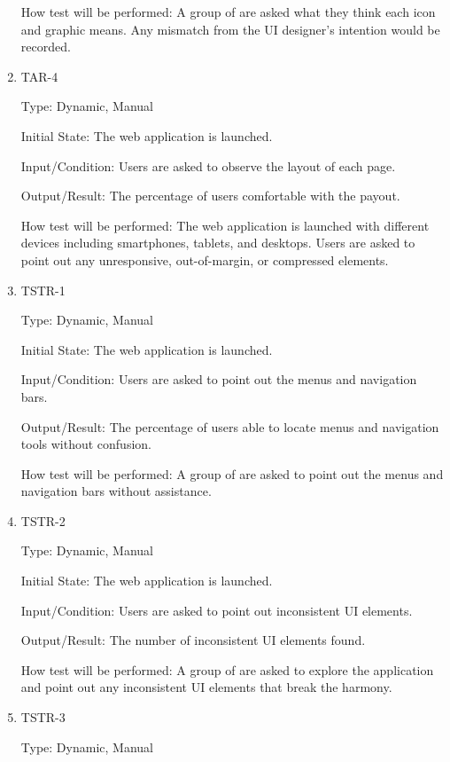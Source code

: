 \documentclass[12pt, titlepage]{article}
\begin{document}
\begin{enumerate}
How test will be performed: A group of are asked what they think each icon and graphic means. Any mismatch from the UI designer's intention would be recorded.

\item{TAR-4\\}

Type: Dynamic, Manual
					
Initial State: The web application is launched.
					
Input/Condition: Users are asked to observe the layout of each page.
					
Output/Result: The percentage of users comfortable with the payout.
					
How test will be performed: The web application is launched with different devices including smartphones, tablets, and desktops.  Users are asked to point out any unresponsive, out-of-margin, or compressed elements.

\item{TSTR-1\\}

Type: Dynamic, Manual
					
Initial State: The web application is launched.
					
Input/Condition: Users are asked to point out the menus and navigation bars.
					
Output/Result: The percentage of users able to locate menus and navigation tools without confusion.
					
How test will be performed: A group of are asked to point out the menus and navigation bars without assistance.

\item{TSTR-2\\}

Type: Dynamic, Manual
					
Initial State: The web application is launched.
					
Input/Condition: Users are asked to point out inconsistent UI elements.
					
Output/Result: The number of inconsistent UI elements found.
					
How test will be performed: A group of are asked to explore the application and point out any inconsistent UI elements that break the harmony.

\item{TSTR-3\\}

Type: Dynamic, Manual
					

\end{enumerate}
\end{document}
